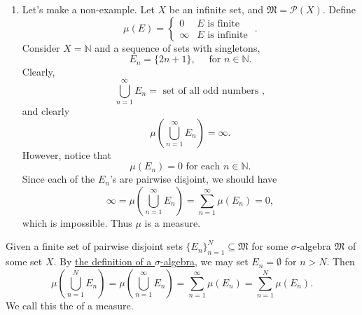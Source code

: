 \documentclass[notoc,notitlepage]{tufte-book}
\begin{document}
\begin{eg}
\begin{enumerate}
    \item Let's make a non-example.
      Let $X$ be an infinite set, and $\mathfrak{M} = \mathcal{P}(X)$.
      Define
      \begin{equation*}
        \mu(E) = \begin{cases}
          0 & E \text{ is finite } \\
          \infty & E \text{ is infinite }
        \end{cases}.
      \end{equation*}
      Consider $X = \mathbb{N}$
      and a sequence of sets with singletons,
      \begin{equation*}
        E_n = \{ 2n + 1 \},\quad \text{ for } n \in \mathbb{N}.
      \end{equation*}
      Clearly,
      \begin{equation*}
        \bigcup_{n=1}^{\infty} E_n = \text{ set of all odd numbers },
      \end{equation*}
      and clearly
      \begin{equation*}
        \mu \left( \bigcup_{n=1}^{\infty} E_n \right) = \infty.
      \end{equation*}
      However, notice that
      \begin{equation*}
        \mu(E_n) = 0 \text{ for each } n \in \mathbb{N}.
      \end{equation*}
      Since each of the $E_n$'s are pairwise disjoint,
      we should have
      \begin{equation*}
        \infty = \mu \left( \bigcup_{n=1}^{\infty} E_n \right)
        = \sum_{n=1}^{\infty} \mu(E_n) = 0,
      \end{equation*}
      which is impossible.
      Thus $\mu$ is  a measure.
  \end{enumerate}
\end{eg}

\begin{remark}
  Given a finite set of pairwise disjoint sets
  $\{ E_n \}_{n=1}^{N} \subseteq \mathfrak{M}$ for some $\sigma$-algebra
  $\mathfrak{M}$ of some set $X$.
  By \hyperref[defn:_sigma_algebra_of_sets]{the definition of a
  $\sigma$-algebra}, we may set $E_n = \emptyset$ for $n > N$.
  Then
  \begin{equation*}
    \mu \left( \bigcup_{n=1}^{N} E_n \right)
    = \mu \left( \bigcup_{n=1}^{\infty} E_n \right)
    = \sum_{n=1}^{\infty} \mu (E_n)
    = \sum_{n=1}^{N} \mu(E_n).
  \end{equation*}
  We call this the  of a measure.
\end{remark}
\end{document}
